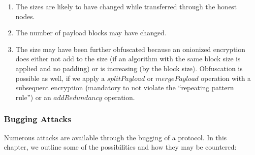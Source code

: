 \begin{enumerate}
	\item The sizes are likely to have changed while transferred through the honest nodes.
	\item The number of payload blocks may have changed.
	\item The size may have been further obfuscated because an onionized encryption does either not add to the size (if an algorithm with the same block size is applied and no padding) or is increasing (by the block size). Obfuscation is possible as well, if we apply a $splitPayload$ or $mergePayload$ operation with a subsequent encryption (mandatory to not violate the ``repeating pattern rule'') or an $addRedundancy$ operation.
\end{enumerate}

\subsubsection{Bugging Attacks}
Numerous attacks are available through the bugging of a protocol. In this chapter, we outline some of the possibilities and how they may be countered:

